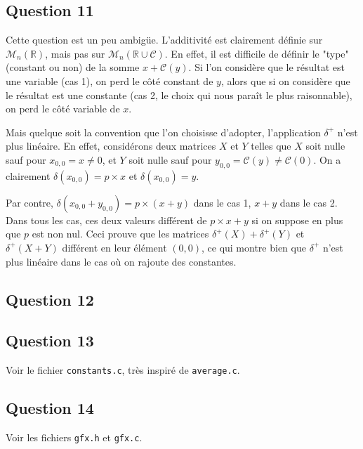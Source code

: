 \documentclass{article}
\begin{document}
\subsection*{Question 11}

Cette question est un peu ambigüe. L'additivité est clairement définie sur $\mathcal{M}_n(\mathbb{R})$, mais pas sur $\mathcal{M}_n(\mathbb{R} \cup \mathcal{C})$. En effet, il est difficile de définir le "type" (constant ou non) de la somme $x + \mathcal{C}(y)$. Si l'on considère que le résultat est une variable (cas 1), on perd le côté constant de $y$, alors que si on considère que le résultat est une constante (cas 2, le choix qui nous paraît le plus raisonnable), on perd le côté variable de $x$.

Mais quelque soit la convention que l'on choisisse d'adopter, l'application $\delta^+$ n'est plus linéaire. En effet, considérons deux matrices $X$ et $Y$ telles que $X$ soit nulle sauf pour $x_{0,0} = x \neq 0$, et $Y$ soit nulle sauf pour $y_{0,0} = \mathcal{C}(y) \neq \mathcal{C}(0)$.
On a clairement $\delta(x_{0,0}) = p \times x$ et $\delta(x_{0,0}) = y$.

Par contre, $\delta(x_{0,0} + y_{0,0}) = p \times (x+y)$ dans le cas 1, $x+y$ dans le cas 2. Dans tous les cas, ces deux valeurs différent de $p \times x + y$ si on suppose en plus que $p$ est non nul. Ceci prouve que les matrices $\delta^+(X) + \delta^+(Y)$ et $\delta^+(X+Y)$ différent en leur élément $(0,0)$, ce qui montre bien que $\delta^+$ n'est plus linéaire dans le cas où on rajoute des constantes.

\subsection*{Question 12}


\subsection*{Question 13}

Voir le fichier \texttt{constants.c}, très inspiré de \texttt{average.c}.

\subsection*{Question 14}

Voir les fichiers \texttt{gfx.h} et \texttt{gfx.c}.
\end{document}
